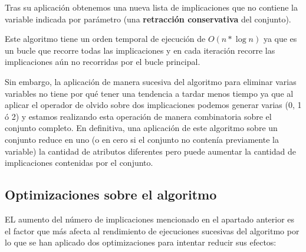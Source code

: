 	Tras su aplicación obtenemos una nueva lista de implicaciones que no contiene la variable indicada por parámetro (una \textbf{retracción conservativa} del conjunto).
	
	Este algoritmo tiene un orden temporal de ejecución de $O(n*\log{n})$ ya que es un bucle que recorre todas las implicaciones y en cada iteración recorre las implicaciones aún no recorridas por el bucle principal. 
	
	Sin embargo, la aplicación de manera sucesiva del algoritmo para eliminar varias variables no tiene por qué tener una tendencia a tardar menos tiempo ya que al aplicar el operador de olvido sobre dos implicaciones podemos generar varias (0, 1 ó 2) y estamos realizando esta operación de manera combinatoria sobre el conjunto completo. En definitiva, una aplicación de este algoritmo sobre un conjunto reduce en uno (o en cero si el conjunto no contenía previamente la variable) la cantidad de atributos diferentes pero puede aumentar la cantidad de implicaciones contenidas por el conjunto. 
	


\subsection*{Optimizaciones sobre el algoritmo}
	
	EL aumento del número de implicaciones mencionado en el apartado anterior es el factor que más afecta al rendimiento de ejecuciones sucesivas del algoritmo por lo que se han aplicado dos optimizaciones para intentar reducir sus efectos:

